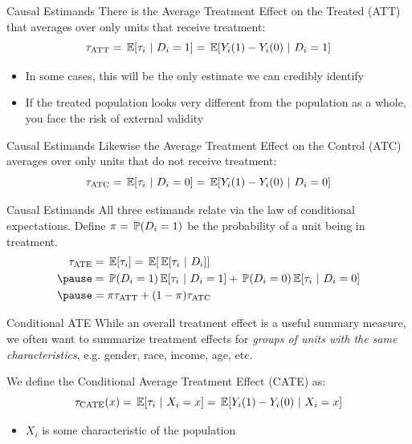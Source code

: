 \documentclass[aspectratio=169,t,11pt,table]{beamer}
\begin{document}
\begin{frame}{Causal Estimands}
  There is the \alert{Average Treatment Effect on the Treated} (ATT) that averages over only units that receive treatment:
  $$
    \tau_{\text{ATT}} = \expec{\tau_i}{D_i = 1} = \expec{Y_i(1) - Y_i(0)}{D_i = 1}
  $$

  \bigskip
  \begin{itemize}
    \item In some cases, this will be the only estimate we can credibly identify
    
    \item If the treated population looks very different from the population as a whole, you face the risk of \alert{external validity} 
  \end{itemize}
\end{frame}

\begin{frame}{Causal Estimands}
  Likewise the \alert{Average Treatment Effect on the Control} (ATC) averages over only units that do not receive treatment:
  $$
    \tau_{\text{ATC}} = \expec{\tau_i}{D_i = 0} = \expec{Y_i(1) - Y_i(0)}{D_i = 0}
  $$
\end{frame}

\begin{frame}{Causal Estimands}
  All three estimands relate via the law of conditional expectations. Define $\pi = \prob{D_i = 1}$ be the probability of a unit being in treatment. 
  \begin{align*}
    \tau_{\text{ATE}} 
    &= \expec{\tau_i} = \expec{\expec{\tau_i}{D_i}} \\
    \pause
    &= \prob{D_i = 1} \expec{\tau_i}{D_i = 1} + \prob{D_i = 0} \expec{\tau_i}{D_i = 0} \\
    \pause
    &= \pi \tau_{\text{ATT}} + (1 - \pi) \tau_{\text{ATC}}  
  \end{align*}
\end{frame}

\begin{frame}{Conditional ATE}
  While an overall treatment effect is a useful summary measure, we often want to summarize treatment effects for \emph{groups of units with the same characteristics}, e.g. gender, race, income, age, etc.
  
  \bigskip
  We define the \alert{Conditional Average Treatment Effect} (CATE) as:
  $$
    \tau_{\text{CATE}}(x) = \expec{\tau_i}{X_i = x} = \expec{Y_i(1) - Y_i(0)}{X_i = x}
  $$
  \begin{itemize}
    \item $X_i$ is some characteristic of the population
  \end{itemize}
\end{frame}
\end{document}
